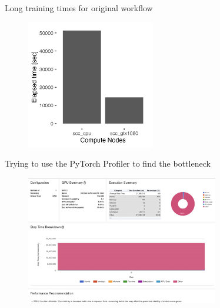 \documentclass[compress,aspectratio=169]{beamer}
\begin{document}
\begin{frame}{Long training times for original workflow}
    \begin{center}
    \begin{figure}
        \includegraphics[width=0.5\textwidth]{./assets/sacct_barplot_by_nodes_profiler-torch_sample-points}
    \end{figure}
    \end{center}
\end{frame}

\begin{frame}{Trying to use the PyTorch Profiler to find the bottleneck}
	\vspace{-1em}
    \begin{center}
    \begin{figure}
        \includegraphics[width=0.75\textwidth]{./assets/scap_gtx1080_profiler-torch_sample-points_14650750}
    \end{figure}
    \end{center}
\end{frame}
\end{document}
